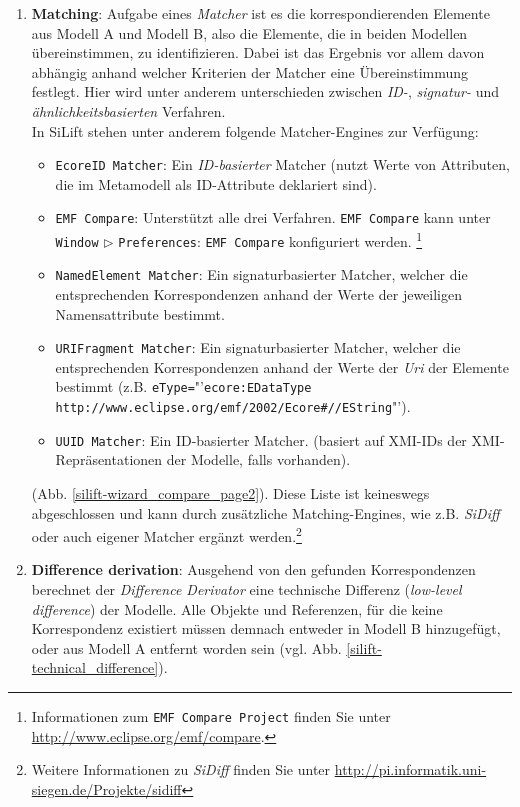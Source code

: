 \documentclass[a4paper]{scrartcl}
\begin{document}
\begin{enumerate}
\item \textbf{Matching}: Aufgabe eines \textit{Matcher} ist es die korrespondierenden Elemente aus Modell A und Modell B, also die Elemente, die in beiden Modellen übereinstimmen, zu identifizieren.
Dabei ist das Ergebnis vor allem davon abhängig anhand welcher Kriterien der Matcher eine Übereinstimmung festlegt.
Hier wird unter anderem unterschieden zwischen \textit{ID-}, \textit{signatur-} und \textit{ähnlichkeitsbasierten} Verfahren.\\
In SiLift stehen unter anderem folgende Matcher-Engines zur Verfügung:

\begin{itemize}
	\item \texttt{EcoreID Matcher}: Ein \textit{ID-basierter} Matcher (nutzt Werte von Attributen, die im Metamodell als ID-Attribute deklariert sind).
	\item \texttt{EMF Compare}: Unterstützt alle drei Verfahren. \texttt{EMF Compare} kann unter \texttt{Win\-dow} $\triangleright$ \texttt{Preferences}: \texttt{EMF Compare} konfiguriert werden. \footnote{Informationen zum \texttt{EMF Compare Project} finden Sie unter \url{http://www.eclipse.org/emf/compare}.}
	
	\item \texttt{NamedElement Matcher}: Ein signaturbasierter Matcher, welcher die ent\-sprech\-enden Korrespondenzen anhand der Werte der jeweiligen Namensattribute bestimmt.
	
	\item \texttt{URIFragment Matcher}: Ein signaturbasierter Matcher, welcher die ent\-sprech\-enden Korrespondenzen anhand der Werte der \textit{Uri} der Elemente bestimmt (z.B. \texttt{eType=}"'\texttt{ecore:EDataType http://www.eclipse.org/emf/2002/\-E\-core\-\#//EString}"').
	
	\item \texttt{UUID Matcher}: Ein ID-basierter Matcher. (basiert auf XMI-IDs der XMI-Repräsentationen der Modelle, falls vorhanden).
\end{itemize}
(Abb. \ref{silift-wizard_compare_page2}).
Diese Liste ist keineswegs abgeschlossen und kann durch zusätzliche Matching-Engines, wie z.B. \textit{SiDiff} oder auch eigener Matcher ergänzt werden.\footnote{Weitere Informationen zu \textit{SiDiff} finden Sie unter \url{http://pi.informatik.uni-siegen.de/Projekte/sidiff}}\\

\item \textbf{Difference derivation}: Ausgehend von den gefunden Korrespondenzen berechnet der \textit{Difference Derivator} eine technische Differenz (\textit{low-level difference}) der Mo\-del\-le.
Alle Objekte und Referenzen, für die keine Korrespondenz existiert müssen demnach entweder in Modell B hinzugefügt, oder aus Modell A entfernt worden sein (vgl. Abb. \ref{silift-technical_difference}).


\end{enumerate}
\end{document}
